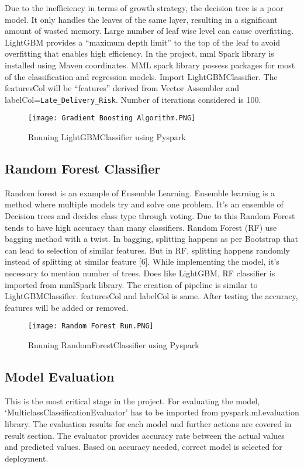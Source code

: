 \documentclass[journal,twoside,web]{ieeecolor}
\begin{document}
Due to the inefficiency in terms of growth strategy, the decision tree is a poor model. It only handles the leaves of the same layer, resulting in a significant amount of wasted memory. Large number of leaf wise level can cause overfitting. LightGBM provides a “maximum depth limit” to the top of the leaf to avoid overfitting that enables high efficiency. In the project, mml Spark library is installed using Maven coordinates. MML spark library possess packages for most of the classification and regression models. Import LightGBMClassifier. The featuresCol will be “features” derived from Vector Assembler and labelCol=\texttt{Late\_Delivery\_Risk}. Number of iterations considered is 100.

\begin{figure}[htbp]
\centerline{\texttt{[image: Gradient Boosting Algorithm.PNG]}}
\caption{Running LightGBMClassifier using Pyspark}
\label{fig13 }
\end{figure}

\subsection{Random Forest Classifier} 

Random forest is an example of Ensemble Learning. Ensemble learning is a method where multiple models try and solve one problem. It’s an ensemble of Decision trees and decides class type through voting. Due to this Random Forest tends to have high accuracy than many classifiers. Random Forest (RF) use bagging method with a twist. In bagging, splitting happens as per Bootstrap that can lead to selection of similar features. But in RF, splitting happens randomly instead of splitting at similar feature [6]. 
While implementing the model, it’s necessary to mention number of trees. Does like LightGBM, RF classifier is imported from mmlSpark library. The creation of pipeline is similar to LightGBMClassifier. featuresCol and labelCol is same. After testing the accuracy, features will be added or removed.

\begin{figure}[htbp]
\centerline{\texttt{[image: Random Forest Run.PNG]}}
\caption{Running RandomForestClassifier using Pyspark}
\label{fig14 }
\end{figure}

\subsection{Model Evaluation} 
This is the most critical stage in the project. For evaluating the model, ‘MulticlassClassificationEvaluator’ has to be imported from pyspark.ml.evaluation library. The evaluation results for each model and further actions are covered in result section. The evaluator provides accuracy rate between the actual values and predicted values.  Based on accuracy needed, correct model is selected for deployment.
\end{document}
